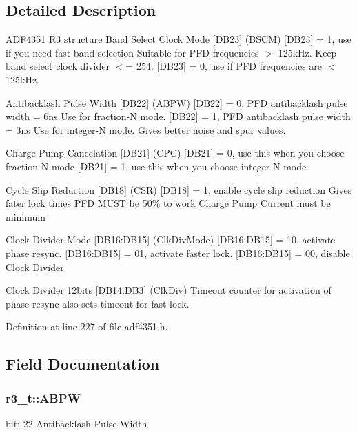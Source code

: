 \subsection{Detailed Description}
A\+D\+F4351 R3 structure Band Select Clock Mode \mbox{[}D\+B23\mbox{]} (B\+S\+CM) \mbox{[}D\+B23\mbox{]} = 1, use if you need fast band selection Suitable for P\+FD frequencies $>$ 125k\+Hz. Keep band select clock divider $<$= 254. \mbox{[}D\+B23\mbox{]} = 0, use if P\+FD frequencies are $<$ 125k\+Hz. 

Antibacklash Pulse Width \mbox{[}D\+B22\mbox{]} (A\+B\+PW) \mbox{[}D\+B22\mbox{]} = 0, P\+FD antibacklash pulse width = 6ns Use for fraction-\/N mode. \mbox{[}D\+B22\mbox{]} = 1, P\+FD antibacklash pulse width = 3ns Use for integer-\/N mode. Gives better noise and spur values.

Charge Pump Cancelation \mbox{[}D\+B21\mbox{]} (C\+PC) \mbox{[}D\+B21\mbox{]} = 0, use this when you choose fraction-\/N mode \mbox{[}D\+B21\mbox{]} = 1, use this when you choose integer-\/N mode

Cycle Slip Reduction \mbox{[}D\+B18\mbox{]} (C\+SR) \mbox{[}D\+B18\mbox{]} = 1, enable cycle slip reduction Gives fater lock times P\+FD M\+U\+ST be 50\% to work Charge Pump Current must be minimum

Clock Divider Mode \mbox{[}D\+B16\+:D\+B15\mbox{]} (Clk\+Div\+Mode) \mbox{[}D\+B16\+:D\+B15\mbox{]} = 10, activate phase resync. \mbox{[}D\+B16\+:D\+B15\mbox{]} = 01, activate faster lock. \mbox{[}D\+B16\+:D\+B15\mbox{]} = 00, disable Clock Divider

Clock Divider 12bits \mbox{[}D\+B14\+:D\+B3\mbox{]} (Clk\+Div) Timeout counter for activation of phase resync also sets timeout for fast lock. 

Definition at line 227 of file adf4351.\+h.



\subsection{Field Documentation}
\subsubsection[{\texorpdfstring{A\+B\+PW}{ABPW}}]{ r3\+\_\+t\+::\+A\+B\+PW}\hypertarget{structr3__t_a5f81f8e2e2dedd4c4b7d939e51ae2c4c}{}\label{structr3__t_a5f81f8e2e2dedd4c4b7d939e51ae2c4c}
bit\+: 22 Antibacklash Pulse Width 

